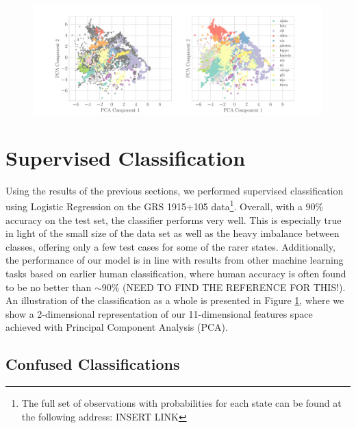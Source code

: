 \documentclass[12pt]{emulateapj}
\begin{document}
%
%


\begin{figure}[htbp]
\begin{center}
\includegraphics[width=\textwidth]{grs1915_supervised_pca_comparison.pdf}
\caption{} 
\label{fig:supervised_pca}
\end{center}
\end{figure}


\section{Supervised Classification}
\label{sec:supervised}

Using the results of the previous sections, we performed supervised classification using Logistic Regression on the GRS 1915+105 data\footnote{The full set of observations with probabilities for each state can be found at the following address: INSERT LINK}. 
Overall, with a $90\%$ accuracy on the test set, the classifier performs very well. This is especially true in light of the small size of the data set as well 
as the heavy imbalance between classes, offering only a few test cases for some of the rarer states. Additionally, the performance of our model is in 
line with results from other machine learning tasks based on earlier human classification, where human accuracy is often found to be no better than 
$\sim 90\%$ (NEED TO FIND THE REFERENCE FOR THIS!). An illustration of the classification as a whole is presented in Figure \ref{fig:supervised_pca}, 
where we show a 2-dimensional representation of our 11-dimensional features space achieved with Principal Component Analysis (PCA). 


\subsection{Confused Classifications}
\label{sec:confusion}
\end{document}
